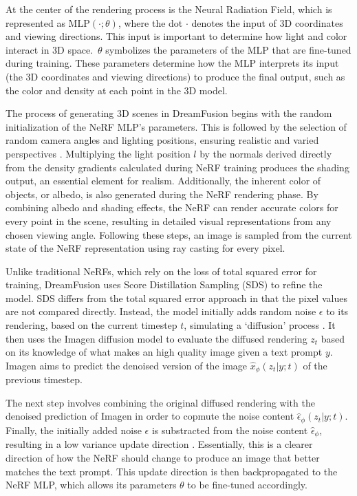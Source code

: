 At the center of the rendering process is the Neural Radiation Field, which is represented as \( \text{MLP}(\cdot; \theta) \), where the dot \(\cdot\) denotes the input of 3D coordinates and viewing directions. This input is important to determine how light and color interact in 3D space.~\(\theta\) symbolizes the parameters of the MLP that are fine-tuned during training. These parameters determine how the MLP interprets its input (the 3D coordinates and viewing directions) to produce the final output, such as the color and density at each point in the 3D model.

The process of generating 3D scenes in DreamFusion begins with the random initialization of the NeRF MLP's parameters. This is followed by the selection of random camera angles and lighting positions, ensuring realistic and varied perspectives \citep{pooleDreamfusion}. Multiplying the light position \( l \) by the normals derived directly from the density gradients calculated during NeRF training produces the shading output, an essential element for realism. Additionally, the inherent color of objects, or albedo, is also generated during the NeRF rendering phase. By combining albedo and shading effects, the NeRF can render accurate colors for every point in the scene, resulting in detailed visual representations from any chosen viewing angle. Following these steps, an image is sampled from the current state of the NeRF representation using ray casting for every pixel.

Unlike traditional NeRFs, which rely on the loss of total squared error for training, DreamFusion uses Score Distillation Sampling (SDS) to refine the model. SDS differs from the total squared error approach in that the pixel values are not compared directly. Instead, the model initially adds random noise \(\epsilon\) to its rendering, based on the current timestep \(t\),  simulating a `diffusion' process \citep{pooleDreamfusion}. It then uses the Imagen diffusion model to evaluate the diffused rendering \(z_t\) based on its knowledge of what makes an high quality image given a text prompt \(y\). Imagen aims to predict the denoised version of the image \(\hat{x}_\phi(z_t | y; t)\) of the previous timestep. 

The next step involves combining the original diffused rendering with the denoised prediction of Imagen in order to copmute the noise content \( \hat{\epsilon}_\phi(z_t | y; t) \). Finally, the initially added noise \(\epsilon\) is substracted from the noise content \(\hat{\epsilon}_\phi\), resulting in a low variance update direction \citep{pooleDreamfusion}. Essentially, this is a clearer direction of how the NeRF should change to produce an image that better matches the text prompt. This update direction is then backpropagated to the NeRF MLP, which allows its parameters \(\theta\) to be fine-tuned accordingly.

